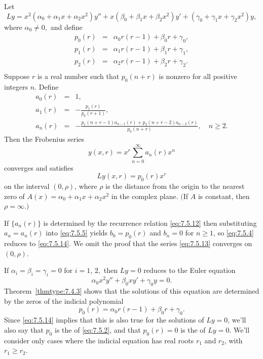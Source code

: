 \documentclass{ximera}
\begin{document}
\begin{theorem}\label{thmtype:7.5.2}
Let
$$
Ly=
x^2(\alpha_0+\alpha_1x+\alpha_2x^2)y''+x(\beta_0+\beta_1x+\beta_2x^2)y'
+(\gamma_0+\gamma_1x+\gamma_2x^2)y,
$$
where $\alpha_0\neq 0,$ and define
\begin{eqnarray*}
p_0(r)&=&\alpha_0r(r-1)+\beta_0r+\gamma_0,\\
p_1(r)&=&\alpha_1r(r-1)+\beta_1r+\gamma_1,\\
p_2(r)&=&\alpha_2r(r-1)+\beta_2r+\gamma_2.\\
\end{eqnarray*}
 Suppose $r$ is a real number such that $p_0(n+r)$ is nonzero
for all positive integers $n.$ Define
\begin{equation} \label{eq:7.5.12}
\begin{array}{ccl}
a_0(r)&=&1,\\
a_1(r)&=&-\frac{p_1(r)}{p_0(r+1)},\\
a_n(r)&=&-\frac{p_1(n+r-1)a_{n-1}(r)+p_2(n+r-2)a_{n-2}(r)}{p_0(n+r)},\quad n\geq2.
\end{array}
\end{equation}
Then the Frobenius series
\begin{equation} \label{eq:7.5.13}
y(x,r)=x^r\sum_{n=0}^\infty a_n(r)x^n
\end{equation}
converges and satisfies
\begin{equation} \label{eq:7.5.14}
Ly(x,r)=p_0(r)x^r
\end{equation}
on the interval $(0,\rho)$, where
 $\rho$ is the distance from the origin to the
nearest zero of $A(x)=\alpha_0+\alpha_1 x+\alpha_2 x^2$ in the complex
plane.
$($If
$A$ is constant, then $\rho=\infty$.$)$
\end{theorem}

 If $\{a_n(r)\}$ is determined by the recurrence relation
\eqref{eq:7.5.12} then substituting $a_n=a_n(r)$ into \eqref{eq:7.5.5}
yields
$b_0=p_0(r)$ and $b_n=0$ for $n\geq1$, so \eqref{eq:7.5.4} reduces to
\eqref{eq:7.5.14}. We omit the proof that the series \eqref{eq:7.5.13}
converges on  $(0,\rho)$.

If $\alpha_i=\beta_i=\gamma_i=0$ for $i=1$, $2,$ then $Ly=0$ reduces to
the Euler equation
$$
\alpha_0x^2y''+\beta_0xy'+\gamma_0y=0.
$$
Theorem~\ref{thmtype:7.4.3} shows that the solutions of this equation are
determined by the zeros of the indicial polynomial
$$
p_0(r)=\alpha_0r(r-1)+\beta_0r+\gamma_0.
$$
Since \eqref{eq:7.5.14} implies that this is also true for the solutions
of $Ly=0$, we'll also say that $p_0$ is the  of \eqref{eq:7.5.2}, and that $p_0(r)=0$ is the  of $Ly=0$. We'll consider only cases where the
indicial equation has real roots $r_1$ and $r_2$, with $r_1\geq r_2$.
\end{document}
